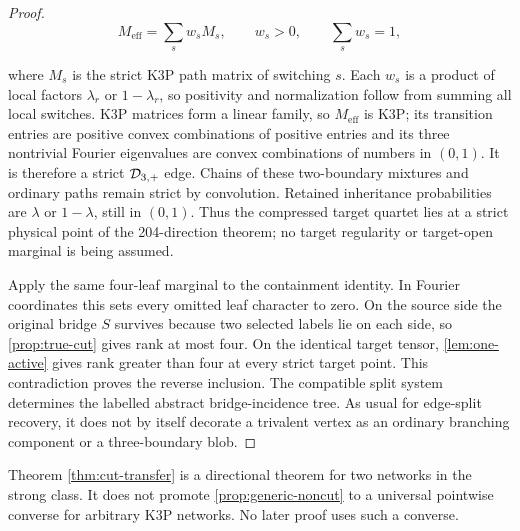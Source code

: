 \begin{proof}
\[
 M_{\mathrm{eff}}=\sum_s w_sM_s,
 \qquad w_s>0,\qquad \sum_s w_s=1,
\]

where \(M_s\) is the strict K3P path matrix of switching \(s\).  Each \(w_s\)
is a product of local factors \(\lambda_r\) or \(1-\lambda_r\), so positivity
and normalization follow from summing all local switches.  K3P matrices form
a linear family, so \(M_{\mathrm{eff}}\) is K3P; its transition entries are
positive convex combinations of positive entries and its three nontrivial
Fourier eigenvalues are convex combinations of numbers in \((0,1)\).  It is
therefore a strict \(\mathcal D_{3,+}\) edge.  Chains of these two-boundary mixtures
and ordinary paths remain strict by convolution.
Retained inheritance probabilities are \(\lambda\) or \(1-\lambda\), still
in \((0,1)\).  Thus the compressed target quartet lies at a strict physical
point of the 204-direction theorem; no target regularity or target-open
marginal is being assumed.

Apply the same four-leaf marginal to the containment identity.  In Fourier
coordinates this sets every omitted leaf character to zero.  On the source
side the original bridge \(S\) survives because two selected labels lie on
each side, so \cref{prop:true-cut} gives rank at most four.  On the identical
target tensor, \cref{lem:one-active} gives rank greater than four at every
strict target point.  This contradiction proves the reverse inclusion.  The
compatible split system determines the labelled abstract bridge-incidence
tree.  As usual for edge-split recovery, it does not by itself decorate a
trivalent vertex as an ordinary branching component or a three-boundary blob.
\end{proof}

\begin{remark}\label{rem:no-universal-cut}
Theorem \ref{thm:cut-transfer} is a directional theorem for two networks in
the strong class.  It does not promote \cref{prop:generic-noncut} to a
universal pointwise converse for arbitrary K3P networks.  No later proof uses
such a converse.
\end{remark}
